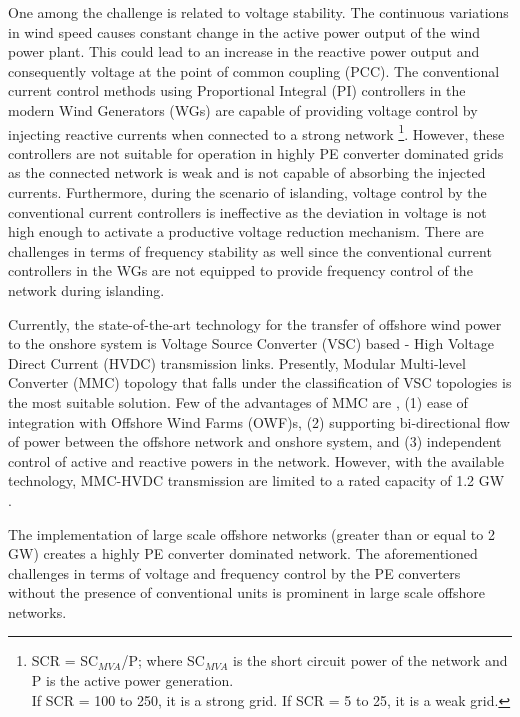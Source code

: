 One among the challenge is related to voltage stability. The continuous variations in wind speed causes constant change in the active power output of the wind power plant. This could lead to an increase in the reactive power output and consequently voltage at the point of common coupling (\gls{PCC}). The conventional current control methods using Proportional Integral (\gls{PI}) controllers in the modern Wind Generators (\gls{WG}s) are capable of providing voltage control by injecting reactive currents when connected to a strong network \footnote{SCR = SC$_{MVA}$/P;\; where SC$_{MVA}$ is the short circuit power of the network and P is the active power generation. \\
If SCR = 100 to 250, it is a strong grid. If SCR = 5 to 25, it is a weak grid.}. However, these controllers are not suitable for operation in highly \gls{PE} converter dominated grids as the connected network is weak and is not capable of absorbing the injected currents. Furthermore, during the scenario of islanding, voltage control by the conventional current controllers is ineffective as the deviation in voltage is not high enough to activate a productive voltage reduction mechanism. There are challenges in terms of frequency stability  as well since the conventional current controllers in the \gls{WG}s are not equipped to provide frequency control of the network during islanding. 

Currently, the state-of-the-art technology for the transfer of offshore wind power to the onshore system is Voltage Source Converter (\gls{VSC}) based  - High Voltage Direct Current (\gls{HVDC}) transmission links. Presently, Modular Multi-level Converter (\gls{MMC}) topology that falls under the classification of \gls{VSC} topologies is the most suitable solution. Few of the advantages of \gls{MMC} are \cite{cigre_B455}, (1) ease of integration with Offshore Wind Farms (\gls{OWF})s, (2) supporting bi-directional flow of power between the offshore network and onshore system, and (3) independent control of active and reactive powers in the network. However, with the available technology, \gls{MMC}-\gls{HVDC} transmission are limited to a rated capacity of 1.2 GW \cite{peralta2012detailed}.

The implementation of large scale offshore networks (greater than or equal to 2 GW) creates a highly \gls{PE} converter dominated network. The aforementioned challenges in terms of voltage and frequency control by the \gls{PE} converters without the presence of conventional units is prominent in large scale offshore networks. 

